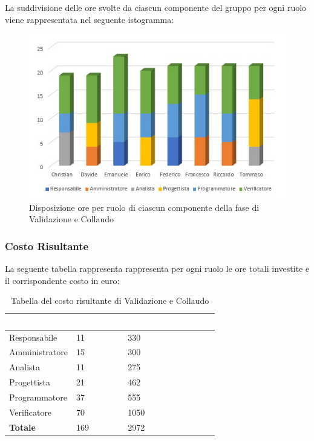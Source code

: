 La suddivisione delle ore svolte da ciascun componente del gruppo per ogni ruolo viene rappresentata nel seguente istogramma:
\begin{figure}[h!]
	\centering
	\includegraphics[scale=2.8]{Sezioni/Istogrammi/IstogrammaValidazione.png}
	\caption{Disposizione ore per ruolo di ciascun componente della fase di Validazione e Collaudo}
\end{figure}

\clearpage

\subsubsection{Costo Risultante}
La seguente tabella rappresenta rappresenta per ogni ruolo le ore totali investite e il corrispondente costo in euro:
{
\renewcommand{\arraystretch}{2}
\begin{longtable}{ C{3cm} C{2cm} C{4cm}}
\caption{Tabella del costo risultante di Validazione e Collaudo}\\

\textcolor{white}{\textbf{Ruolo}} & 
\textcolor{white}{\textbf{Totale ore}} & 
\textcolor{white}{\textbf{Costo ruolo in euro}}\\	
\endhead
        
Responsabile    &  11 &  330 \\
Amministratore  &  15 &  300 \\
Analista        &  11 &  275 \\
Progettista     &  21 &  462 \\
Programmatore   &  37 &  555 \\
Verificatore    &  70 & 1050 \\
\textbf{Totale} & 169 & 2972 \\
	
\end{longtable}
}

